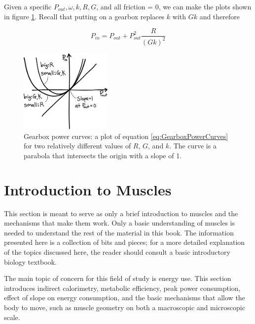 Given a specific $P_{out}, \omega, k, R, G$, and all friction = 0, we can make the plots shown in figure \ref{fig:GearboxPowerCurves}. Recall that putting on a gearbox replaces $k$ with $Gk$ and therefore


\begin{equation}
P_{in}=P_{out}+P_{out}^{2}\frac{R}{(Gk)^{2}}
\label{eq:GearboxPowerCurves}
\end{equation}


\begin{figure}[htb]		%
\begin{centering}
\includegraphics[width=0.4\textwidth]{Figures/GearboxPowerCurves}\par
\end{centering}
\caption[Plot: Gearbox Power Curves]{Gearbox power curves: a plot of equation \ref{eq:GearboxPowerCurves} for two relatively different values of $R$, $G$, and $k$. The curve is a parabola that intersects the origin with a slope of 1.}
\label{fig:GearboxPowerCurves}
\end{figure}
%


\section{Introduction to Muscles} %
\label{sec:IntroductionToMuscles}

This section is meant to serve as only a brief introduction to muscles and the mechanisms that make them work. Only a basic understanding of muscles is needed to understand the rest of the material in this book. The information presented here is a collection of bits and pieces; for a more detailed explanation of the topics discussed here, the reader should consult a basic introductory biology textbook. 

The main topic of concern for this field of study is energy use. This section introduces indirect calorimetry, metabolic efficiency, peak power consumption, effect of slope on energy consumption, and the basic mechanisms that allow the body to move, such as muscle geometry on both a macroscopic and microscopic scale. 

